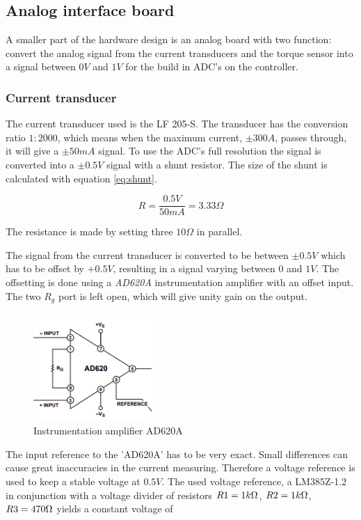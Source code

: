 	\subsection{Analog interface board}
	A smaller part of the hardware design is an analog board with two function: convert the analog signal from the current transducers and the torque sensor into a signal between $0V$ and $1V$ for the build in ADC's on the controller.
	
	\subsubsection{Current transducer}
	The current transducer used is the LF 205-S. The transducer has the conversion ratio $1:2000$, which means when the maximum current, $\pm 300A$, passes through, it will give a $\pm 50mA$ signal. To use the ADC's full resolution the signal is converted into a $\pm 0.5V$ signal with a shunt resistor. The size of the shunt is calculated with equation \ref{eq:shunt}.
	
	\begin{equation}
		R = \frac{0.5V}{50mA} = 3.33\Omega
		\label{eq:shunt}
	\end{equation}
	
	The resistance is made by setting three $10 \Omega$ in parallel.

	The signal from the current transducer is converted to be between $\pm 0.5V$ which has to be offset by $+0.5V$, resulting in a signal varying between $0$ and $1V$. The offsetting is done using a \textit{AD620A} instrumentation amplifier with an offset input. The two $R_g$ port is left open, which will give unity gain on the output.
	
	\begin{figure}[H]
		\centering
		\includegraphics[width=0.4\textwidth]{pictures/hardware/Analog_Interface_board/AD620A.PNG}
		\caption{Instrumentation amplifier AD620A}
		\label{fig:AD620A}
	\end{figure} 
	
	The input reference to the 'AD620A' has to be very exact. Small differences can cause great inaccuracies in the current measuring. Therefore a voltage reference is used to keep a stable voltage at $0.5V$. The used voltage reference, a LM385Z-1.2 in conjunction with a voltage divider of resistors $R1 = 1k\ohm$, $R2 = 1k\ohm$, $R3 = 470\ohm$ yields a constant voltage of
	
